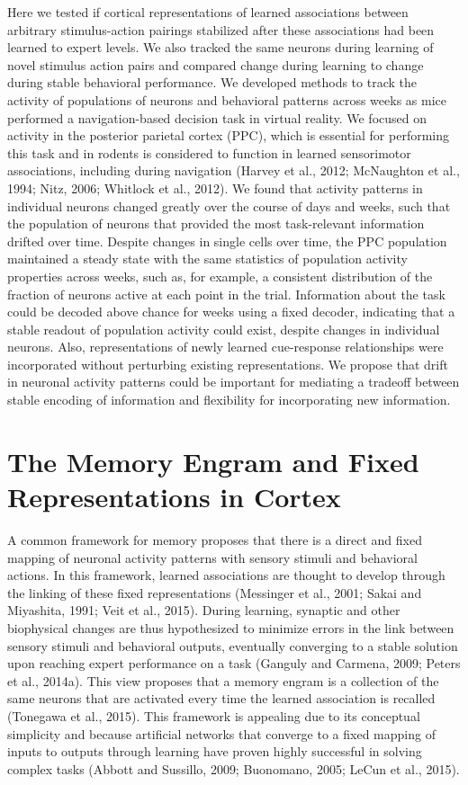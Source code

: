 Here we tested if cortical representations of learned associations between arbitrary stimulus-action pairings stabilized after these associations had been learned to expert levels. We also tracked the same neurons during learning of novel stimulus action pairs and compared change during learning to change during stable behavioral performance. We developed methods to track the activity of populations of neurons and behavioral patterns across weeks as mice performed a navigation-based decision task in virtual reality. We focused on activity in the posterior parietal cortex (PPC), which is essential for performing this task and in rodents is considered to function in learned sensorimotor associations, including during navigation (Harvey et al., 2012; McNaughton et al., 1994; Nitz, 2006; Whitlock et al., 2012). We found that activity patterns in individual neurons changed greatly over the course of days and weeks, such that the population of neurons that provided the most task-relevant information drifted over time. Despite changes in single cells over time, the PPC population maintained a steady state with the same statistics of population activity properties across weeks, such as, for example, a consistent distribution of the fraction of neurons active at each point in the trial. Information about the task could be decoded above chance for weeks using a fixed decoder, indicating that a stable readout of population activity could exist, despite changes in individual neurons. Also, representations of newly learned cue-response relationships were incorporated without perturbing existing representations. We propose that drift in neuronal activity patterns could be important for mediating a tradeoff between stable encoding of information and flexibility for incorporating new information.

\section{The Memory Engram and Fixed Representations in Cortex} \label{intro:engram/fixed rep}

A common framework for memory proposes that there is a direct and fixed mapping of neuronal activity patterns with sensory stimuli and behavioral actions. In this framework, learned associations are thought to develop through the linking of these fixed representations (Messinger et al., 2001; Sakai and Miyashita, 1991; Veit et al., 2015). During learning, synaptic and other biophysical changes are thus hypothesized to minimize errors in the link between sensory stimuli and behavioral outputs, eventually converging to a stable solution upon reaching expert performance on a task (Ganguly and Carmena, 2009; Peters et al., 2014a). This view proposes that a memory engram is a collection of the same neurons that are activated every time the learned association is recalled (Tonegawa et al., 2015). This framework is appealing due to its conceptual simplicity and because artificial networks that converge to a fixed mapping of inputs to outputs through learning have proven highly successful in solving complex tasks (Abbott and Sussillo, 2009; Buonomano, 2005; LeCun et al., 2015). 

